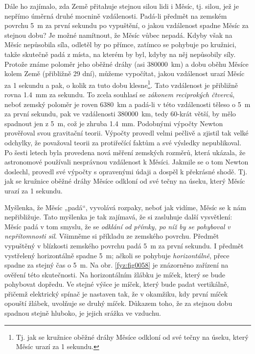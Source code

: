     Dále ho zajímalo, zda Země přitahuje stejnou silou lidi i Měsíc, tj. silou, jež je nepřímo 
    úměrná druhé mocnině vzdálenosti. Padá-li předmět na zemském povrchu \qty{5}{\m} za první 
    sekundu po vypuštění, o jakou vzdálenost spadne Měsíc za stejnou dobu? Je možné namítnout, že 
    Měsíc vůbec nepadá. Kdyby však na Měsíc nepůsobila síla, odletěl by po přímce, zatímco se 
    pohybuje po kružnici, takže skutečně padá z místa, na kterém by byl, kdyby na něj nepůsobily 
    síly. Protože známe poloměr jeho oběžné dráhy (asi \qty{380000}{\km}) a dobu oběhu Měsíce kolem 
    Země (přibližně \num{29} dní), můžeme vypočítat, jakou vzdálenost urazí Měsíc za \num{1} 
    sekundu a pak, o kolik za tuto dobu klesne\footnote{Tj. jak se kružnice oběžné dráhy Měsíce 
    odkloní od své tečny na úseku, který Měsíc urazí za 1 sekundu.}. Tato vzdálenost je přibližně 
    rovna \qty{1.4}{\mm} za sekundu. To zcela souhlasí se \emph{zákonem reciprokých čtverců}, neboť 
    zemský poloměr je roven \qty{6380}{\km} a padá-li v této vzdálenosti těleso o \qty{5}{\m} za 
    první sekundu, pak ve vzdálenosti \qty{380000}{\km}, tedy \num{60}-krát větší, by mělo spadnout 
    jen  z \qty{5}{\m}, což je zhruba \qty{1.4}{\mm}. Podobnými výpočty Newton prověřoval 
    svou gravitační teorii. Výpočty provedl velmi pečlivě a zjistil tak velké odchylky, že 
    považoval teorii za protiřečící faktům a své výsledky nepublikoval. Po šesti letech byla 
    provedena nová měření zemských rozměrů, která ukázala, že astronomové používali nesprávnou 
    vzdálenost k Měsíci. Jakmile se o tom Newton doslechl, provedl své výpočty s opravenými údaji a 
    dospěl k překrásné shodě. Tj. jak se kružnice oběžné dráhy Měsíce odkloní od své tečny na 
    úseku, který Měsíc urazí za \num{1} sekundu.
    
    Myšlenka, že Měsíc „padá“, vyvolává rozpaky, neboť jak vidíme, Měsíc se k nám nepřibližuje. 
    Tato myšlenka je tak zajímavá, že si zasluhuje další vysvětlení: Měsíc padá v tom smyslu, že se 
    \emph{odklání od přímky, po níž by se pohyboval v nepřítomnosti sil}. Všimněme si příkladu ze 
    zemského povrchu. Předmět vypuštěný v blízkosti zemského povrchu padá \qty{5}{\m} za první 
    sekundu. I předmět vystřelený horizontálně spadne \qty{5}{\m}; ačkoli se pohybuje 
    \emph{horizontálně}, přece spadne za stejný čas o \qty{5}{\m}. Na obr. \ref{fyz:fig0058} je 
    znázorněno zařízení na ověření této skutečnosti. Na horizontálním žlábku je míček, který se 
    bude pohybovat dopředu. Ve stejné výšce je míček, který bude padat vertikálně, přičemž 
    elektrický spínač je nastaven tak, že v okamžiku, kdy první míček opouští žlábek, uvolňuje se 
    druhý míček. Důkazem toho, že za stejnou dobu spadnou stejně hluboko, je jejich srážka ve 
    vzduchu.
    
